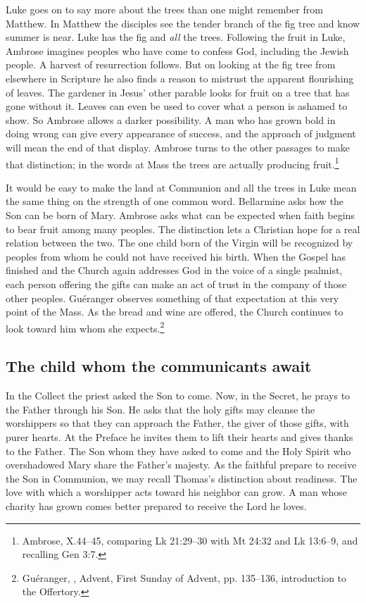 Luke goes on to say more about the trees than one might remember from Matthew. In Matthew the disciples see the tender branch of the fig tree and know summer is near. Luke has the fig and \emph{all} the trees. Following the fruit in Luke, Ambrose imagines peoples who have come to confess God, including the Jewish people. A harvest of resurrection follows. But on looking at the fig tree from elsewhere in Scripture he also finds a reason to mistrust the apparent flourishing of leaves. The gardener in Jesus' other parable looks for fruit on a tree that has gone without it. Leaves can even be used to cover what a person is ashamed to show. So Ambrose allows a darker possibility. A man who has grown bold in doing wrong can give every appearance of success, and the approach of judgment will mean the end of that display. Ambrose turns to the other passages to make that distinction; in the words at Mass the trees are actually producing fruit.\footnote{Ambrose,  X.44--45, comparing Lk 21:29--30 with Mt 24:32 and Lk 13:6--9, and recalling Gen 3:7.}

It would be easy to make the land at Communion and all the trees in Luke mean the same thing on the strength of one common word. Bellarmine asks how the Son can be born of Mary. Ambrose asks what can be expected when faith begins to bear fruit among many peoples. The distinction lets a Christian hope for a real relation between the two. The one child born of the Virgin will be recognized by peoples from whom he could not have received his birth. When the Gospel has finished and the Church again addresses God in the voice of a single psalmist, each person offering the gifts can make an act of trust in the company of those other peoples. Guéranger observes something of that expectation at this very point of the Mass. As the bread and wine are offered, the Church continues to look toward him whom she expects.\footnote{Guéranger, , Advent, First Sunday of Advent, pp. 135--136, introduction to the Offertory.}

\subsection{The child whom the communicants await}

In the Collect the priest asked the Son to come. Now, in the Secret, he prays to the Father through his Son. He asks that the holy gifts may cleanse the worshippers so that they can approach the Father, the giver of those gifts, with purer hearts. At the Preface he invites them to lift their hearts and gives thanks to the Father. The Son whom they have asked to come and the Holy Spirit who overshadowed Mary share the Father's majesty. As the faithful prepare to receive the Son in Communion, we may recall Thomas's distinction about readiness. The love with which a worshipper acts toward his neighbor can grow. A man whose charity has grown comes better prepared to receive the Lord he loves.

